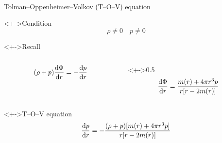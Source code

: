 \documentclass{beamer}
\let\svthefootnote\thefootnote
\newcommand\blankfootnote[1]{%
  \let\thefootnote\relax\footnotetext{#1}%
  \let\thefootnote\svthefootnote%
}
\begin{document}
\begin{frame}{Tolman--Oppenheimer--Volkov (T--O--V) equation}

\begin{block}<+->{Condition}
\begin{displaymath}
  \rho \neq 0 \quad p \neq 0
\end{displaymath}
\end{block}

\begin{block}<+->{Recall}

\begin{columns}[c]
\begin{column}{0.5\textwidth}
\begin{displaymath}
  (\rho + p) \dv{\Phi}{r} = -\dv{p}{r}
\end{displaymath}
\end{column}

\begin{column}<+->{0.5\textwidth}
\begin{displaymath}
  \dv{\Phi}{r} = \frac{m(r) + 4 \pi r^3 p}{r [r - 2 m(r)]}
\end{displaymath}
\end{column}
\end{columns}

\end{block}

\begin{block}<+->{T--O--V equation}
\begin{displaymath}
  \dv{p}{r} =
 -\frac{(\rho + p) [m(r) + 4 \pi r^3 p]}{r [r - 2m(r)]}
\end{displaymath}
\end{block}

\blankfootnote{\textcite[pp. 261--264]{Schutz}}



\end{frame}
\end{document}

